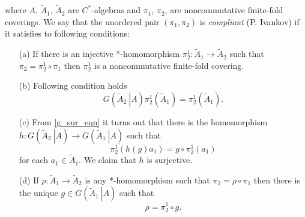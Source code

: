 \documentclass{beamer}
\theoremstyle{plain}
\newcommand{\be}{\begin{equation}}
\newcommand{\ee}{\end{equation}}
\begin{document}
	where $A$, $\widetilde A_1$, $\widetilde A_2$ are $C^*$-algebras and $\pi_1$, $\pi_2$, are noncommutative finite-fold coverings. We say that the unordered pair $\left( \pi_1,\pi_2\right) $ is \textit{compliant} (\alert{P. Ivankov}) if  it satisfies to following conditions:
	\begin{enumerate}
		\item[(a)]
		If there is an injective *-homomorphism $\pi^1_2: \widetilde A_1 \to \widetilde A_2$ such that $\pi_2 = \pi^1_2 \circ \pi_1$ then $\pi^1_2$ is  a noncommutative finite-fold  covering.
		\item[(b)] Following condition holds
		\be\label{g_sur_eqn}
		G\left(\left.\widetilde A_2~\right|A \right)\pi^1_2\left(\widetilde A_1\right)=  \pi^1_2\left(\widetilde A_1\right).
		\ee 
\pagebreak
\newline
		\item[(c)] From \eqref{g_sur_eqn} it turns out that there is the homomorphism $h: G\left(\left.\widetilde A_2~\right|A \right)\to 	G\left(\left.\widetilde A_1~\right|A \right)$ such that 
		$$
		\pi^1_2\left( h\left(g \right)a_1\right) = g \circ \pi^1_2\left(a_1 \right)
		$$
		for each $a_1 \in \widetilde A_1$.  
		We claim that $h$ is surjective. 
		\item[(d)] If  $\rho: \widetilde A_1 \to \widetilde A_2$ is any *-homomorphism  such that $\pi_2 = \rho \circ \pi_1$ then there is the unique $g \in 	G\left(\left.\widetilde A_1~\right|A \right)$ such that 
		\be\label{compliant_covering_g_eqn}
		\rho =  \pi^1_2 \circ g.
		\ee
		\newline
	\end{enumerate}
\end{document}
